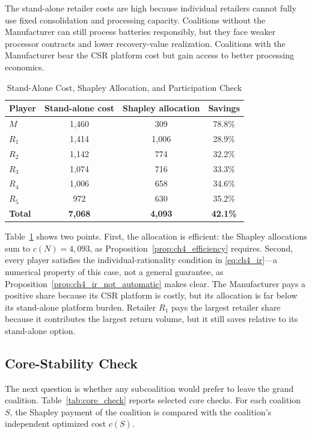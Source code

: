 The stand-alone retailer costs are high because individual retailers cannot fully use fixed consolidation and processing capacity. Coalitions without the Manufacturer can still process batteries responsibly, but they face weaker processor contracts and lower recovery-value realization. Coalitions with the Manufacturer bear the CSR platform cost but gain access to better processing economics.

\begin{table}[htbp]
\centering
\caption{Stand-Alone Cost, Shapley Allocation, and Participation Check}
\label{tab:cost_comparison}
\begin{tabular}{lccc}
\toprule
\textbf{Player} & \textbf{Stand-alone cost} & \textbf{Shapley allocation} & \textbf{Savings} \\
\midrule
$M$ & 1,460 & 309 & 78.8\% \\
$R_1$ & 1,414 & 1,006 & 28.9\% \\
$R_2$ & 1,142 & 774 & 32.2\% \\
$R_3$ & 1,074 & 716 & 33.3\% \\
$R_4$ & 1,006 & 658 & 34.6\% \\
$R_5$ & 972 & 630 & 35.2\% \\
\midrule
\textbf{Total} & \textbf{7,068} & \textbf{4,093} & \textbf{42.1\%} \\
\bottomrule
\end{tabular}
\end{table}

Table~\ref{tab:cost_comparison} shows two points. First, the allocation is efficient: the Shapley allocations sum to $c(N)=4{,}093$, as Proposition~\ref{prop:ch4_efficiency} requires. Second, every player satisfies the individual-rationality condition in \eqref{eq:ch4_ir}---a numerical property of this case, not a general guarantee, as Proposition~\ref{prop:ch4_ir_not_automatic} makes clear. The Manufacturer pays a positive share because its CSR platform is costly, but its allocation is far below its stand-alone platform burden. Retailer $R_1$ pays the largest retailer share because it contributes the largest return volume, but it still saves relative to its stand-alone option.

\subsection{Core-Stability Check}

The next question is whether any subcoalition would prefer to leave the grand coalition. Table~\ref{tab:core_check} reports selected core checks. For each coalition $S$, the Shapley payment of the coalition is compared with the coalition's independent optimized cost $c(S)$.

